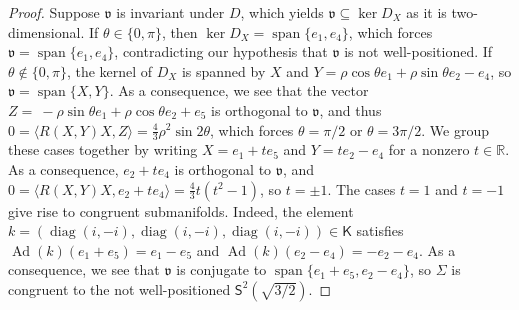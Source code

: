\documentclass[11pt,a4paper,final]{amsart}
\newcommand{\s}{\mathsf}
\newcommand{\g}{\mathfrak}
\newcommand{\R}{\mathbb{R}}
\newcommand{\Ad}{\operatorname{Ad}}
\newcommand{\vecspan}{\operatorname{span}}
\theoremstyle{definition}
\begin{document}
\begin{proof}
	Suppose $\g{v}$ is invariant under $D$, which yields $\g{v}\subseteq \ker D_{X}$ as it is two-dimensional.
	If $\theta \in \{0,\pi\}$, then $\ker D_{X}=\vecspan \{e_{1},e_{4}\}$, which forces $\g{v}=\vecspan\{e_{1},e_{4}\}$, contradicting our hypothesis that $\g{v}$ is not well-positioned.
	If $\theta\notin\{0,\pi\}$, the kernel of $D_{X}$ is spanned by $X$ and $Y=\rho \cos \theta e_{1}+\rho \sin \theta e_{2}-e_{4}$, so $\g{v}=\vecspan\{X,Y\}$.
	As a consequence, we see that the vector $Z=~-\rho \sin \theta e_{1}+\rho \cos \theta e_{2}+e_{5}$ is orthogonal to $\g{v}$, and thus
	$0=\langle R(X,Y)X,Z \rangle=\frac{4}{3}\rho^{2}\sin 2\theta$,
	which forces $\theta = \pi/2$ or $\theta=3\pi/2$. 
	We group these cases together by writing $X=e_1+t e_5$ and $Y=te_2-e_4$	for a nonzero $t\in \R$.
	As a consequence, $e_{2}+t e_{4}$ is orthogonal to $\g{v}$, and	$0=\langle R(X,Y)X,e_{2}+t e_{4} \rangle=\frac{4}{3}t(t^{2}-1)$,
	so $t=\pm 1$.
	The cases $t=1$ and $t=-1$ give rise to congruent submanifolds.
	Indeed, the element
		$k=(\operatorname{diag}(i,-i),\operatorname{diag}(i,-i),\operatorname{diag}(i,-i))\in\mathsf{K}$
	satisfies $\Ad(k)(e_{1}+e_{5})=e_{1}-e_{5}$ and $\Ad(k)(e_{2}-e_{4})=-e_{2}-e_{4}$.
	As a consequence, we see that $\g{v}$ is conjugate to $\operatorname{span}\{e_{1}+e_{5},e_{2}-e_{4}\}$, so $\Sigma$ is congruent to the not well-positioned $\s{S}^{2}(\sqrt{3/2})$.
		

\end{proof}
\end{document}
